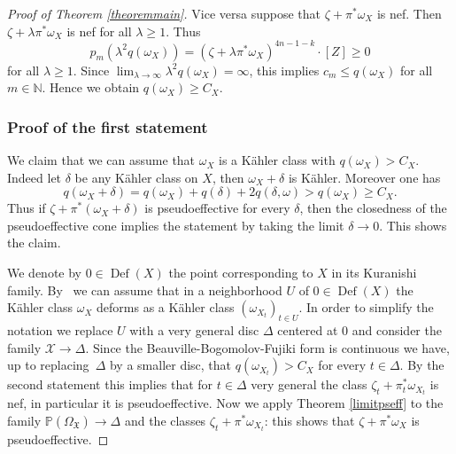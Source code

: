 \documentclass[11pt]{article}
\let\mathcal\mathscr
\theoremstyle{plain}
\theoremstyle{definition}
\newcommand{\N}{\ensuremath{\mathbb{N}}}
\newcommand{\PP}{\ensuremath{\mathbb{P}}}
\DeclareMathOperator{\Def}{Def}
\begin{document}
\begin{proof}[Proof of Theorem \ref{theoremmain}]
Vice versa suppose that $\zeta+\pi^* \omega_X$ is nef. Then $\zeta+ \lambda \pi^* \omega_X$ is nef for all $\lambda \geq 1$.
Thus
\[
p_m(\lambda^2 q(\omega_X)) = (\zeta + \lambda \pi^* \omega_X)^{4n-1-k} \cdot [Z] \geq 0
\]
for all $\lambda \geq 1$. Since $\lim_{\lambda \to \infty} \lambda^2 q(\omega_X) = \infty$, this implies $c_m \leq q(\omega_X)$ for all $m \in \N$. Hence we obtain $q(\omega_X) \geq C_X$.

\subsubsection*{Proof of the first statement}
We claim that we can assume that $\omega_X$ is a Kähler class with $q(\omega_X)>C_X$.
Indeed let $\delta$ be any Kähler class on $X$, then $\omega_X+\delta$ is Kähler. Moreover one has
\[
q(\omega_X+\delta)=q(\omega_X)+q(\delta)+2q(\delta,\omega)>
q(\omega_X) \geq C_X.
\]
Thus if $\zeta+\pi^* (\omega_{X}+\delta)$ is pseudoeffective for every $\delta$, then
the closedness of the pseudoeffective cone implies the statement by
taking the limit $\delta \to 0$. This shows the claim.

We denote by $0\in \Def(X)$ the point corresponding to $X$ in its Kuranishi family. By~\cite[Prop.\,5.6]{Huy16} we can assume that in a neighborhood $U$ of $0\in \Def(X)$ the Kähler class $\omega_X$ deforms as a Kähler class $(\omega_{X_t})_{t \in U}$.
In order to simplify the notation we replace $U$ with a very general disc $\Delta$ centered at $0$ and consider the family $\mathcal{X} \to \Delta$.
Since the Beauville-Bogomolov-Fujiki form is continuous we have, up to replacing~$\Delta$ by a smaller disc, that
$q(\omega_{X_t}) > C_X$ for every $t \in \Delta$.
By the second statement this implies that for $t \in \Delta$ very general the class $\zeta_t + \pi_t^* \omega_{X_t}$ is nef, in particular it is pseudoeffective. Now we apply Theorem \ref{limitpseff} to the family $\PP(\Omega_\mathfrak{X}) \to \Delta$ and the classes $\zeta_{t}+\pi^*\omega_{X_t}$: this shows that $\zeta + \pi^* \omega_{X}$
is pseudoeffective.
\end{proof}
\end{document}
